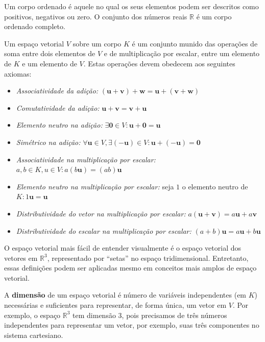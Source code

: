         Um corpo ordenado é aquele no qual os seus elementos podem ser descritos como positivos, negativos ou zero. O conjunto dos números reais $\mathbb{R}$ é um corpo ordenado completo.

        Um espaço vetorial $V$ sobre um corpo $K$ é um conjunto munido das operações de soma entre dois elementos de $V$ e de multiplicação por escalar, entre um elemento de $K$ e um elemento de $V$. Estas operações devem obedecem aos seguintes axiomas:

        \begin{itemize}
            \item \textit{Associatividade da adição:} $(\mathbf{u} + \mathbf{v}) + \mathbf{w} = \mathbf{u} + (\mathbf{v} + \mathbf{w})$
            \item \textit{Comutatividade da adição:} $\mathbf{u} + \mathbf{v} = \mathbf{v} + \mathbf{u}$
            \item \textit{Elemento neutro na adição:} $\exists \mathbf{0} \in V :\mathbf{u} + \mathbf{0} = \mathbf{u}$
            \item \textit{Simétrico na adição:} $\forall \mathbf{u} \in V, \exists (\mathbf{-u}) \in V :\mathbf{u} + (\mathbf{-u}) = \mathbf{0}$
            \item \textit{Associatividade na multiplicação por escalar:} $a,b \in K, u \in V : a(b\mathbf{u}) = (ab)\mathbf{u}$
            \item \textit{Elemento neutro na multiplicação por escalar:} seja $1$ o elemento neutro de $K : 1\mathbf{u} = \mathbf{u}$
            \item \textit{Distributividade do vetor na multiplicação por escalar:} $a(\mathbf{u} + \mathbf{v}) = a\mathbf{u} + a\mathbf{v}$
            \item \textit{Distributividade do escalar na multiplicação por escalar:} $(a+b)\mathbf{u} = a\mathbf{u} + b\mathbf{u}$
        \end{itemize}

        O espaço vetorial mais fácil de entender visualmente é o espaço vetorial dos vetores em $\mathbb{R}^3$, representado por ``setas'' no espaço tridimensional. Entretanto, essas definições podem ser aplicadas mesmo em conceitos mais amplos de espaço vetorial.

        A \textbf{dimensão} de um espaço vetorial é número de variáveis independentes (em $K$) necessárias e suficientes para representar, de forma única, um vetor em $V$. Por exemplo, o espaço $\mathbb{R}^3$ tem dimensão $3$, pois precisamos de três números independentes para representar um vetor, por exemplo, suas três componentes no sistema cartesiano.

